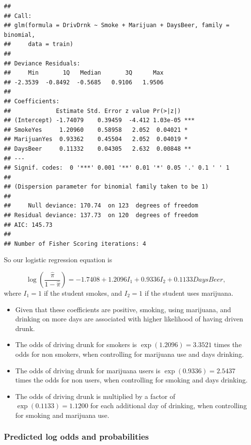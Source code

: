 \documentclass[
]{book}
\providecommand{\tightlist}{%
  \setlength{\itemsep}{0pt}\setlength{\parskip}{0pt}}
\begin{document}
\begin{verbatim}
## 
## Call:
## glm(formula = DrivDrnk ~ Smoke + Marijuan + DaysBeer, family = binomial, 
##     data = train)
## 
## Deviance Residuals: 
##     Min       1Q   Median       3Q      Max  
## -2.3539  -0.8492  -0.5685   0.9106   1.9506  
## 
## Coefficients:
##             Estimate Std. Error z value Pr(>|z|)    
## (Intercept) -1.74079    0.39459  -4.412 1.03e-05 ***
## SmokeYes     1.20960    0.58958   2.052  0.04021 *  
## MarijuanYes  0.93362    0.45504   2.052  0.04019 *  
## DaysBeer     0.11332    0.04305   2.632  0.00848 ** 
## ---
## Signif. codes:  0 '***' 0.001 '**' 0.01 '*' 0.05 '.' 0.1 ' ' 1
## 
## (Dispersion parameter for binomial family taken to be 1)
## 
##     Null deviance: 170.74  on 123  degrees of freedom
## Residual deviance: 137.73  on 120  degrees of freedom
## AIC: 145.73
## 
## Number of Fisher Scoring iterations: 4
\end{verbatim}

So our logistic regression equation is

\[
\log \left( \frac{\hat{\pi}}{1-\hat{\pi}}   \right) = -1.7408 + 1.2096I_1 + 0.9336I_2 + 0.1133 DaysBeer,
\]
where \(I_1 = 1\) if the student smokes, and \(I_2 = 1\) if the student uses marijuana.

\begin{itemize}
\tightlist
\item
  Given that these coefficients are positive, smoking, using marijuana, and drinking on more days are associated with higher likelihood of having driven drunk.
\item
  The odds of driving drunk for smokers is \(\exp(1.2096) = 3.3521\) times the odds for non smokers, when controlling for marijuana use and days drinking.
\item
  The odds of driving drunk for marijuana users is \(\exp(0.9336) = 2.5437\) times the odds for non users, when controlling for smoking and days drinking.
\item
  The odds of driving drunk is multiplied by a factor of \(\exp(0.1133) = 1.1200\) for each additional day of drinking, when controlling for smoking and marijuana use.
\end{itemize}

\hypertarget{predicted-log-odds-and-probabilities}{%
\subsubsection*{Predicted log odds and probabilities}\label{predicted-log-odds-and-probabilities}}
\end{document}
